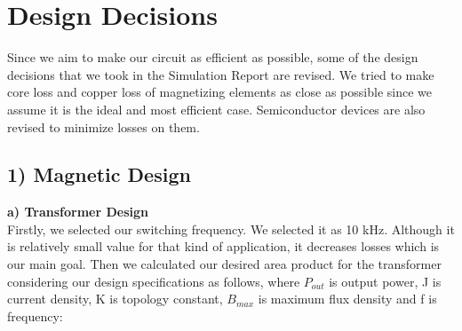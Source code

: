 \documentclass{article}
\newcommand\tab[1][1cm]{\hspace*{#1}}
\begin{document}
\newpage
\section*{Design Decisions}
\tab Since we aim to make our circuit as efficient as possible, some of the design decisions that we took in the Simulation Report are revised. We tried to make core loss and copper loss of magnetizing elements as close as possible since we assume it is the ideal and most efficient case. Semiconductor devices are also revised to minimize losses on them.
\subsection*{1) Magnetic Design}
\tab\textbf{a) Transformer Design} \\
\tab Firstly, we selected our switching frequency. We selected it as 10 kHz. Although it is relatively small value for that kind of application, it decreases losses which is our main goal. Then we calculated our desired area product for the transformer considering our design specifications as follows, where $P_{out}$ is output power, J is current density, K is topology constant, $B_{max}$ is maximum flux density and f is frequency:
\end{document}
